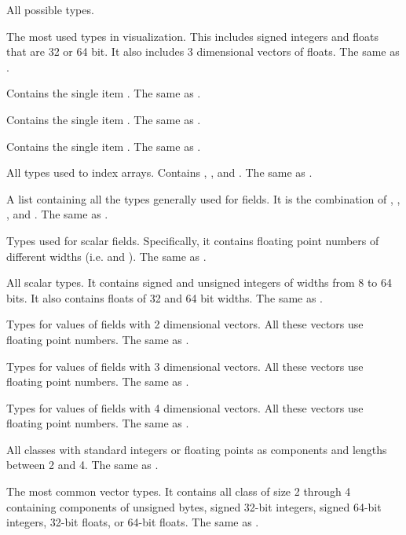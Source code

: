 \begin{description}
  \label{TypeTagList}
\item[\sigtag{AllTypes}] All possible types.
\item[\sigtag{CommonTypes}] The most used types in visualization. This
  includes signed integers and floats that are 32 or 64 bit. It also
  includes 3 dimensional vectors of floats. The same as
  .
\item[\sigtag{IdType}] Contains the single item . The same as
  .
\item[\sigtag{Id2Type}] Contains the single item . The same as
  .
\item[\sigtag{Id3Type}] Contains the single item . The same as
  .
\item[\sigtag{Index}] All types used to index arrays. Contains ,
  , and . The same as .
\item[\sigtag{FieldCommon}] A list containing all the types generally
  used for fields. It is the combination of , ,
  , and . The same as .
\item[\sigtag{Scalar}] Types used for scalar fields. Specifically, it
  contains floating point numbers of different widths (i.e. 
  and ). The same as .
\item[\sigtag{ScalarAll}] All scalar types. It contains signed and unsigned
  integers of widths from 8 to 64 bits. It also contains floats of 32 and
  64 bit widths. The same as .
\item[\sigtag{Vec2}] Types for values of fields with 2 dimensional
  vectors. All these vectors use floating point numbers. The same as
  .
\item[\sigtag{Vec3}] Types for values of fields with 3 dimensional
  vectors. All these vectors use floating point numbers. The same as
  .
\item[\sigtag{Vec4}] Types for values of fields with 4 dimensional
  vectors. All these vectors use floating point numbers. The same as
  .
\item[\sigtag{VecAll}] All  classes with standard integers or
  floating points as components and lengths between 2 and 4. The same as
  .
\item[\sigtag{VecCommon}] The most common vector types. It contains all
   class of size 2 through 4 containing components of unsigned
  bytes, signed 32-bit integers, signed 64-bit integers, 32-bit floats, or
  64-bit floats. The same as .
\end{description}

